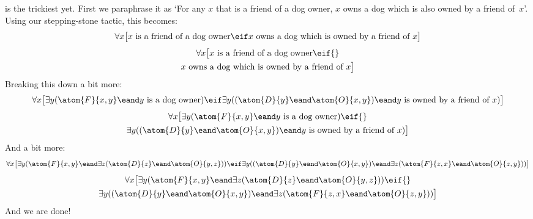  is the trickiest yet. First we paraphrase it as
`For any $x$ that is a friend of a dog owner, $x$ owns a dog which is
also owned by a friend of~$x$'. Using our stepping-stone tactic, this
becomes:
\ifHTMLtarget
\[\forall x\bigl[x\text{ is a friend of a dog owner}\eif 
x\text{ owns a dog which is owned by a friend of }x\bigr]\]
\else
\begin{multline*}
\forall x\bigl[x\text{ is a friend of a dog owner}\eif {}\\
x\text{ owns a dog which is owned by a friend of }x\bigr]
\end{multline*}
\fi
Breaking this down a bit more:
\ifHTMLtarget
\[\forall x\bigl[\exists y(\atom{F}{x,y} \eand y\text{ is a dog owner})\eif
\exists y((\atom{D}{y} \eand \atom{O}{x,y}) \eand y\text{ is owned by
a friend of }x)\bigr]\]
\else
\begin{multline*}
	\forall x\bigl[\exists y(\atom{F}{x,y} \eand y\text{ is a dog owner})\eif {}\\
\exists y((\atom{D}{y} \eand \atom{O}{x,y}) \eand y\text{ is owned by a friend of }x)\bigr]
\end{multline*}
\fi
And a bit more: 
\ifHTMLtarget
\[\forall x\bigl[\exists y(\atom{F}{x,y} \eand \exists z(\atom{D}{z} \eand \atom{O}{y,z})) \eif 
\exists y((\atom{D}{y} \eand \atom{O}{x,y}) \eand \exists z(\atom{F}{z,x} \eand \atom{O}{z,y}))\bigr]\]
\else
\begin{multline*}
\forall x\bigl[\exists y(\atom{F}{x,y} \eand \exists z(\atom{D}{z} \eand \atom{O}{y,z})) \eif {}\\
\exists y((\atom{D}{y} \eand \atom{O}{x,y}) \eand \exists z(\atom{F}{z,x} \eand \atom{O}{z,y}))\bigr]
\end{multline*}
\fi
And we are done!

